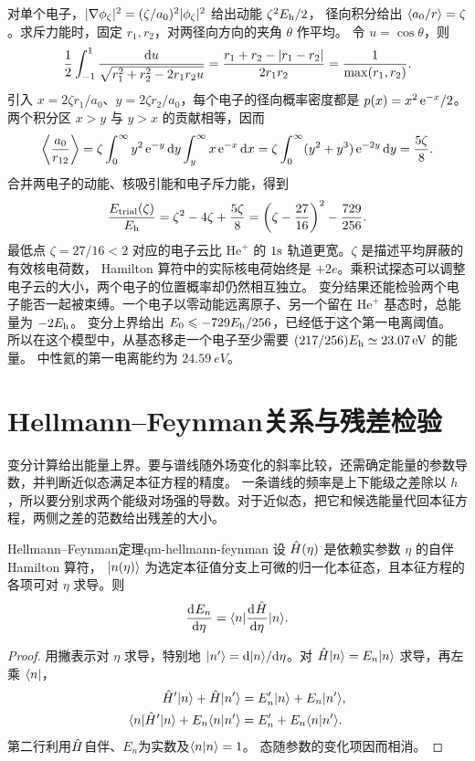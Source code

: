 对单个电子，$\lvert\nabla\phi_\zeta\rvert^2 = (\zeta/a_0)^2\lvert\phi_\zeta\rvert^2$ 给出动能 $\zeta^2 E_{\mathrm h}/2$，
径向积分给出 $\langle a_0/r\rangle = \zeta$。求斥力能时，固定 $r_1,r_2$，对两径向方向的夹角 $\theta$ 作平均。
令 $u = \cos\theta$，则
\[
    \frac12\int_{-1}^1\frac{\mathop{}\!\mathrm{d} u}{\sqrt{r_1^2 + r_2^2 - 2r_1r_2u}}
    = \frac{r_1 + r_2 - \lvert r_1 - r_2\rvert}{2r_1r_2}
    = \frac{1}{\max(r_1,r_2)} .
\]
引入 $x = 2\zeta r_1/a_0$、$y = 2\zeta r_2/a_0$，每个电子的径向概率密度都是 $p(x) = x^2\mathop{}\!\mathrm{e}^{-x}/2$。
两个积分区 $x > y$ 与 $y > x$ 的贡献相等，因而
\[
    \biggl\langle\frac{a_0}{r_{12}}\biggr\rangle
    = \zeta\int_0^\infty y^2\mathop{}\!\mathrm{e}^{-y}\mathop{}\!\mathrm{d} y\int_y^\infty x\mathop{}\!\mathrm{e}^{-x}\mathop{}\!\mathrm{d} x
    = \zeta\int_0^\infty (y^2 + y^3)\mathop{}\!\mathrm{e}^{-2y}\mathop{}\!\mathrm{d} y
    = \frac{5\zeta}{8}.
\]
合并两电子的动能、核吸引能和电子斥力能，得到
\begin{equation}\label{eq:qm-helium-variational-energy}
    \frac{E_{\mathrm{trial}}(\zeta)}{E_{\mathrm h}}
       = \zeta^2 - 4\zeta + \frac{5\zeta}{8}
       = \biggl(\zeta - \frac{27}{16}\biggr)^2 - \frac{729}{256}.
\end{equation}
最低点 $\zeta = 27/16 < 2$ 对应的电子云比 $\mathrm{He}^+$ 的 $1\mathrm{s}$ 轨道更宽。$\zeta$ 是描述平均屏蔽的有效核电荷数，
Hamilton 算符中的实际核电荷始终是 $+2e$。乘积试探态可以调整电子云的大小，两个电子的位置概率却仍然相互独立。
变分结果还能检验两个电子能否一起被束缚。一个电子以零动能远离原子、另一个留在 $\mathrm{He}^+$ 基态时，总能量为 $-2E_{\mathrm h}$。
变分上界给出 $E_0 \leqslant -729E_{\mathrm h}/256$，已经低于这个第一电离阈值。
所以在这个模型中，从基态移走一个电子至少需要 $(217/256)E_{\mathrm h} \simeq \qty{23.07}{eV}$ 的能量。
中性氦的第一电离能约为 $\qty{24.59}{eV}$\cite{nisthelium}。

\section{Hellmann--Feynman关系与残差检验}
\label{sec:hellmann}
变分计算给出能量上界。要与谱线随外场变化的斜率比较，还需确定能量的参数导数，并判断近似态满足本征方程的精度。
一条谱线的频率是上下能级之差除以 $h$，所以要分别求两个能级对场强的导数。对于近似态，把它和候选能量代回本征方程，两侧之差的范数给出残差的大小。

\begin{theorem}{Hellmann--Feynman定理}{qm-hellmann-feynman}
    设 $\hat{H}(\eta)$ 是依赖实参数 $\eta$ 的自伴 Hamilton 算符，
    $\lvert n(\eta)\rangle$ 为选定本征值分支上可微的归一化本征态，且本征方程的各项可对 $\eta$ 求导。则
    \begin{equation}
        \frac{\mathop{}\!\mathrm{d}^{}E_n}{\mathrm{d}{\eta}^{}} = \langle n\vert\frac{\mathop{}\!\mathrm{d}^{}\hat{H}}{\mathrm{d}{\eta}^{}}\vert n\rangle.
    \end{equation}
\end{theorem}
\begin{proof}
用撇表示对 $\eta$ 求导，特别地 $\lvert n'\rangle = \mathop{}\!\mathrm{d}\lvert n\rangle/\mathrm{d}\eta$。对 $\hat{H}\lvert n\rangle = E_n\lvert n\rangle$ 求导，再左乘 $\langle n\rvert$，
\begin{alignat*}{1}
    \hat{H}'\lvert n\rangle + \hat{H}\lvert n'\rangle &= E_n'\lvert n\rangle + E_n\lvert n'\rangle,\\
    \langle n\vert\hat{H}'\vert n\rangle + E_n\langle n\vert n'\rangle &= E_n' + E_n\langle n\vert n'\rangle .
\end{alignat*}
第二行利用$\hat{H}$自伴、$E_n$为实数及$\langle n\vert n\rangle = 1$。
态随参数的变化项因而相消。
\end{proof}

